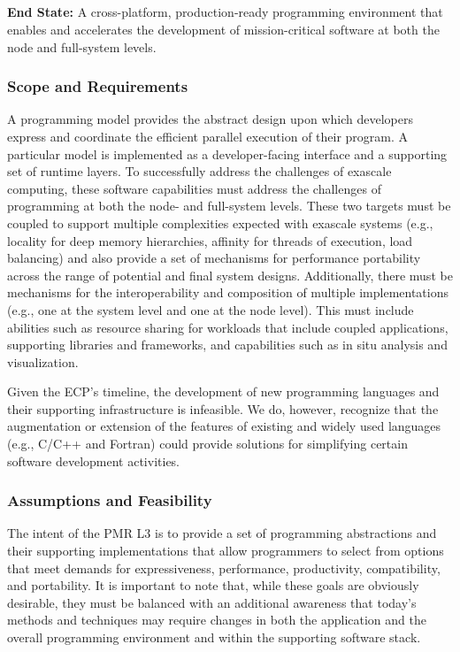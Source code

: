 \subsection{  \pmr}

\textbf{End State:} A cross-platform, production-ready programming environment that enables and accelerates the development of mission-critical software at both the node and full-system levels.

\subsubsection{Scope and Requirements}
A programming model provides the abstract design upon which developers express and coordinate the efficient parallel execution of their program. A particular model is implemented as a developer-facing interface and a supporting set of runtime layers. To successfully address the challenges of exascale computing, these software capabilities must address the challenges of programming at both the node- and full-system levels. These two targets must be coupled to support multiple complexities expected with exascale systems (e.g., locality for deep memory hierarchies, affinity for threads of execution, load balancing) and also provide a set of mechanisms for performance portability across the range of potential and final system designs. Additionally, there must be mechanisms for the interoperability and composition of multiple implementations (e.g., one at the system level and one at the node level). This must include abilities such as resource sharing for workloads that include coupled applications, supporting libraries and frameworks, and capabilities such as in situ analysis and visualization. 

Given the ECP’s timeline, the development of new programming languages and their supporting infrastructure is infeasible. We do, however, recognize that the augmentation or extension of the features of existing and widely used languages (e.g., C/C++ and Fortran) could provide solutions for simplifying certain software development activities. 

\subsubsection{Assumptions and Feasibility}
The intent of the PMR L3 is to provide a set of programming abstractions and their supporting implementations that allow programmers to select from options that meet demands for expressiveness, performance, productivity, compatibility, and portability. It is important to note that, while these goals are obviously desirable, they must be balanced with an additional awareness that today’s methods and techniques may require changes in both the application and the overall programming environment and within the supporting software stack.

